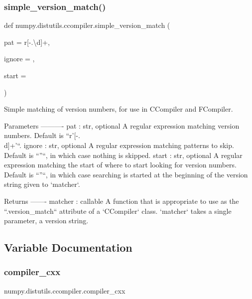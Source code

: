 \subsubsection{\texorpdfstring{simple\+\_\+version\+\_\+match()}{simple\_version\_match()}}
{\footnotesize\ttfamily def numpy.\+distutils.\+ccompiler.\+simple\+\_\+version\+\_\+match (\begin{DoxyParamCaption}\item[{}]{pat = {\ttfamily r\textquotesingle{}\mbox{[}-\/.\textbackslash{}d\mbox{]}+\textquotesingle{}},  }\item[{}]{ignore = {\ttfamily \textquotesingle{}\textquotesingle{}},  }\item[{}]{start = {\ttfamily \textquotesingle{}\textquotesingle{}} }\end{DoxyParamCaption})}

\begin{DoxyVerb}Simple matching of version numbers, for use in CCompiler and FCompiler.

Parameters
----------
pat : str, optional
    A regular expression matching version numbers.
    Default is ``r'[-.\\d]+'``.
ignore : str, optional
    A regular expression matching patterns to skip.
    Default is ``''``, in which case nothing is skipped.
start : str, optional
    A regular expression matching the start of where to start looking
    for version numbers.
    Default is ``''``, in which case searching is started at the
    beginning of the version string given to `matcher`.

Returns
-------
matcher : callable
    A function that is appropriate to use as the ``.version_match``
    attribute of a `CCompiler` class. `matcher` takes a single parameter,
    a version string.\end{DoxyVerb}
 

\subsection{Variable Documentation}
\mbox{\label{namespacenumpy_1_1distutils_1_1ccompiler_a8c888df935067ddaf7e96a73aad727b2}} 
\subsubsection{\texorpdfstring{compiler\+\_\+cxx}{compiler\_cxx}}
{\footnotesize\ttfamily numpy.\+distutils.\+ccompiler.\+compiler\+\_\+cxx}

